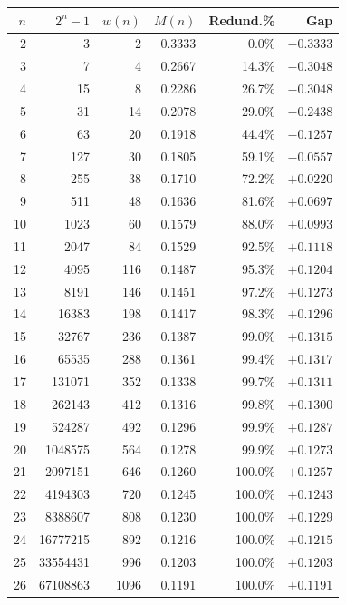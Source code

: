 \documentclass[11pt,a4paper]{amsart}
\theoremstyle{plain}
\theoremstyle{definition}
\theoremstyle{remark}
\begin{document}
\begin{table}[H]
\centering
\small
\begin{tabular}{r|rrrrr}
\hline
$n$ & $2^n-1$ & $w(n)$ & $M(n)$ & Redund.\% & Gap \\
\hline
 2 &          3 &    2 & 0.3333 &  0.0\% & $-0.3333$ \\
 3 &          7 &    4 & 0.2667 & 14.3\% & $-0.3048$ \\
 4 &         15 &    8 & 0.2286 & 26.7\% & $-0.3048$ \\
 5 &         31 &   14 & 0.2078 & 29.0\% & $-0.2438$ \\
 6 &         63 &   20 & 0.1918 & 44.4\% & $-0.1257$ \\
 7 &        127 &   30 & 0.1805 & 59.1\% & $-0.0557$ \\
 8 &        255 &   38 & 0.1710 & 72.2\% & $+0.0220$ \\
 9 &        511 &   48 & 0.1636 & 81.6\% & $+0.0697$ \\
10 &       1023 &   60 & 0.1579 & 88.0\% & $+0.0993$ \\
11 &       2047 &   84 & 0.1529 & 92.5\% & $+0.1118$ \\
12 &       4095 &  116 & 0.1487 & 95.3\% & $+0.1204$ \\
13 &       8191 &  146 & 0.1451 & 97.2\% & $+0.1273$ \\
14 &      16383 &  198 & 0.1417 & 98.3\% & $+0.1296$ \\
15 &      32767 &  236 & 0.1387 & 99.0\% & $+0.1315$ \\
16 &      65535 &  288 & 0.1361 & 99.4\% & $\mathbf{+0.1317}$ \\
17 &     131071 &  352 & 0.1338 & 99.7\% & $+0.1311$ \\
18 &     262143 &  412 & 0.1316 & 99.8\% & $+0.1300$ \\
19 &     524287 &  492 & 0.1296 & 99.9\% & $+0.1287$ \\
20 &    1048575 &  564 & 0.1278 & 99.9\% & $+0.1273$ \\
21 &    2097151 &  646 & 0.1260 &100.0\% & $+0.1257$ \\
22 &    4194303 &  720 & 0.1245 &100.0\% & $+0.1243$ \\
23 &    8388607 &  808 & 0.1230 &100.0\% & $+0.1229$ \\
24 &   16777215 &  892 & 0.1216 &100.0\% & $+0.1215$ \\
25 &   33554431 &  996 & 0.1203 &100.0\% & $+0.1203$ \\
26 &   67108863 & 1096 & 0.1191 &100.0\% & $+0.1191$ \\

\end{tabular}
\end{table}
\end{document}
